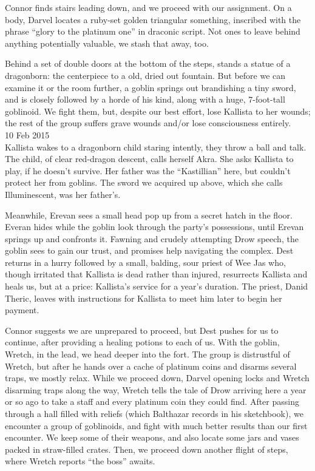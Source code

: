 \documentclass[letterpaper]{article}
\begin{document}
Connor finds stairs leading down, and we proceed with our assignment. On a body, Darvel locates a ruby-set golden triangular something, inscribed with the phrase ``glory to the platinum one'' in draconic script. Not ones to leave behind anything potentially valuable, we stash that away, too.

Behind a set of double doors at the bottom of the steps, stands a statue of a dragonborn: the centerpiece to a old, dried out fountain. But before we can examine it or the room further, a goblin springs out brandishing a tiny sword, and is closely followed by a horde of his kind, along with a huge, 7-foot-tall goblinoid. We fight them, but, despite our best effort, lose Kallista to her wounds; the rest of the group suffers grave wounds and/or lose consciousness entirely.\\

10 Feb 2015\\
Kallista wakes to a dragonborn child staring intently, they throw a ball and talk. The child, of clear red-dragon descent, calls herself Akra. She asks Kallista to play, if he doesn't survive. Her father was the ``Kastillian'' here, but couldn't protect her from goblins. The sword we acquired up above, which she calls Illuminescent, was her father's.

Meanwhile, Erevan sees a small head pop up from a secret hatch in the floor. Everan hides while the goblin look through the party's possessions, until Erevan springs up and confronts it. Fawning and crudely attempting Drow speech, the goblin sees to gain our trust, and promises help navigating the complex. Dest returns in a hurry followed by a small, balding, sour priest of Wee Jas who, though irritated that Kallista is dead rather than injured, resurrects Kallista and heals us, but at a price: Kallista's service for a year's duration. The priest, Danid Theric, leaves with instructions for Kallista to meet him later to begin her payment.

Connor suggests we are unprepared to proceed, but Dest pushes for us to continue, after providing a healing potions to each of us. With the goblin, Wretch, in the lead, we head deeper into the fort. The group is distrustful of Wretch, but after he hands over a cache of platinum coins and disarms several traps, we mostly relax. While we proceed down, Darvel opening locks and Wretch disarming traps along the way, Wretch tells the tale of Drow arriving here a year or so ago to take a staff and every platinum coin they could find. After passing through a hall filled with reliefs (which Balthazar records in his sketchbook), we encounter a group of goblinoids, and fight with much better results than our first encounter. We keep some of their weapons, and also locate some jars and vases packed in straw-filled crates. Then, we proceed down another flight of steps, where Wretch reports ``the boss'' awaits.\\
\end{document}
